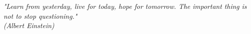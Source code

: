\begin{epigrafe}
    \vspace*{\fill}
	\begin{flushright}

		\textit{"Learn from yesterday, live for today, hope for tomorrow. The important thing is not to stop questioning."\\
		(Albert Einstein)}
	\end{flushright}
\end{epigrafe}
